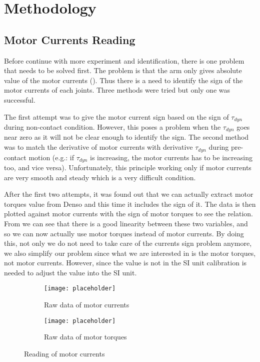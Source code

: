 \chapter{Methodology}
\section{Motor Currents Reading}
\label{motor currents}

Before continue with more experiment and identification, there is one problem that needs to be solved first. The problem is that the arm only gives absolute value of the motor currents (). Thus there is a need to identify the sign of the motor currents of each joints. Three methods were tried but only one was successful.

The first attempt was to give the motor current sign based on the sign of $\tau_{dyn}$ during non-contact condition. However, this poses a problem when the $\tau_{dyn}$ goes near zero as it will not be clear enough to identify the sign. The second method was to match the derivative of motor currents with derivative $\tau_{dyn}$ during pre-contact motion (e.g.: if $\tau_{dyn}$ is increasing, the motor currents has to be increasing too, and vice versa). Unfortunately, this principle working only if motor currents are very smooth and steady which is a very difficult condition.

After the first two attempts, it was found out that we can actually extract motor torques value from Denso and this time it includes the sign of it. The data is then plotted against motor currents with the sign of motor torques to see the relation. From  we can see that there is a good linearity between these two variables, and so we can now actually use motor torques instead of motor currents. By doing this, not only we do not need to take care of the currents sign problem anymore, we also simplify our problem since what we are interested in is the motor torques, not motor currents. However, since the value is not in the SI unit calibration is needed to adjust the value into the SI unit. 

\begin{figure}[h]
  \begin{subfigure}[t]{0.5\textwidth}
    \centering
    \texttt{[image: placeholder]} 
    \caption{Raw data of motor currents}
    \label{fig:raw current}
  \end{subfigure}
  \begin{subfigure}[t]{0.5\textwidth}
    \centering
    \texttt{[image: placeholder]}
    \caption{Raw data of motor torques}
    \label{fig:raw torque}
  \end{subfigure}
  \caption{Reading of motor currents}
\end{figure}

